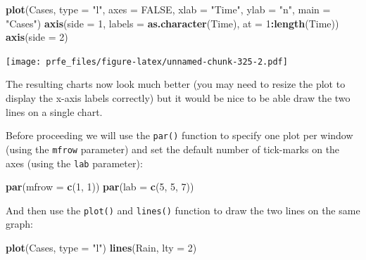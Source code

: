 \documentclass[12pt,a4paper]{book}
\newenvironment{Shaded}{\begin{snugshade}}{\end{snugshade}}
\newcommand{\KeywordTok}[1]{\textcolor[rgb]{0.13,0.29,0.53}{\textbf{#1}}}
\newcommand{\DataTypeTok}[1]{\textcolor[rgb]{0.13,0.29,0.53}{#1}}
\newcommand{\DecValTok}[1]{\textcolor[rgb]{0.00,0.00,0.81}{#1}}
\newcommand{\StringTok}[1]{\textcolor[rgb]{0.31,0.60,0.02}{#1}}
\newcommand{\OtherTok}[1]{\textcolor[rgb]{0.56,0.35,0.01}{#1}}
\newcommand{\OperatorTok}[1]{\textcolor[rgb]{0.81,0.36,0.00}{\textbf{#1}}}
\newcommand{\NormalTok}[1]{#1}
\theoremstyle{definition}
\theoremstyle{definition}
\theoremstyle{definition}
\theoremstyle{remark}
\begin{document}
\begin{Shaded}
\begin{Highlighting}[]
\KeywordTok{plot}\NormalTok{(Cases, }\DataTypeTok{type =} \StringTok{"l"}\NormalTok{, }\DataTypeTok{axes =} \OtherTok{FALSE}\NormalTok{, }\DataTypeTok{xlab =} \StringTok{"Time"}\NormalTok{, }\DataTypeTok{ylab =} \StringTok{"n"}\NormalTok{, }\DataTypeTok{main =} \StringTok{"Cases"}\NormalTok{)}
\KeywordTok{axis}\NormalTok{(}\DataTypeTok{side =} \DecValTok{1}\NormalTok{, }\DataTypeTok{labels =} \KeywordTok{as.character}\NormalTok{(Time), }\DataTypeTok{at =} \DecValTok{1}\OperatorTok{:}\KeywordTok{length}\NormalTok{(Time))}
\KeywordTok{axis}\NormalTok{(}\DataTypeTok{side =} \DecValTok{2}\NormalTok{)}
\end{Highlighting}
\end{Shaded}

\texttt{[image: prfe\_files/figure-latex/unnamed-chunk-325-2.pdf]}

The resulting charts now look much better (you may need to resize the
plot to display the x-axis labels correctly) but it would be nice to be
able draw the two lines on a single chart.

Before proceeding we will use the \texttt{par()} function to specify one
plot per window (using the \texttt{mfrow} parameter) and set the default
number of tick-marks on the axes (using the \texttt{lab} parameter):

\begin{Shaded}
\begin{Highlighting}[]
\KeywordTok{par}\NormalTok{(}\DataTypeTok{mfrow =} \KeywordTok{c}\NormalTok{(}\DecValTok{1}\NormalTok{, }\DecValTok{1}\NormalTok{))}
\KeywordTok{par}\NormalTok{(}\DataTypeTok{lab =} \KeywordTok{c}\NormalTok{(}\DecValTok{5}\NormalTok{, }\DecValTok{5}\NormalTok{, }\DecValTok{7}\NormalTok{))}
\end{Highlighting}
\end{Shaded}

And then use the \texttt{plot()} and \texttt{lines()} function to draw
the two lines on the same graph:

\begin{Shaded}
\begin{Highlighting}[]
\KeywordTok{plot}\NormalTok{(Cases, }\DataTypeTok{type =} \StringTok{"l"}\NormalTok{)}
\KeywordTok{lines}\NormalTok{(Rain, }\DataTypeTok{lty =} \DecValTok{2}\NormalTok{)}
\end{Highlighting}
\end{Shaded}
\end{document}
